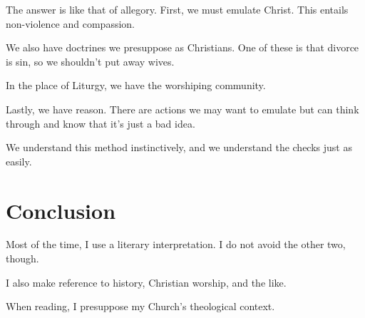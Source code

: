 \documentclass{beamer}
\begin{document}
\begin{frame}
  The answer is like that of allegory.
  First, we must emulate Christ.
  This entails non-violence and compassion.
\end{frame}

\begin{frame}
  We also have doctrines we presuppose as Christians.
  One of these is that divorce is sin, so we shouldn't put away wives.
\end{frame}

\begin{frame}
  In the place of Liturgy, we have the worshiping community.
\end{frame}

\begin{frame}
  Lastly, we have reason.
  There are actions we may want to emulate but can think through and know that it's just a bad idea.
\end{frame}

\begin{frame}
  We understand this method instinctively, and we understand the checks just as easily.
\end{frame}

\section{Conclusion}

\begin{frame}
  Most of the time, I use a literary interpretation.
  I do not avoid the other two, though.
\end{frame}

\begin{frame}
  I also make reference to history, Christian worship, and the like.
\end{frame}

\begin{frame}
  When reading, I presuppose my Church's theological context.
\end{frame}
\end{document}
